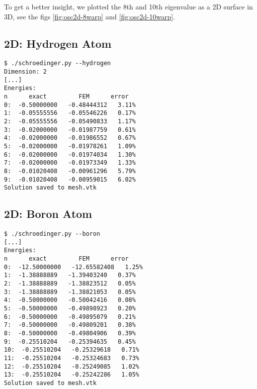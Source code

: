 








To get a better insight, we plotted the 8th and 10th eigenvalue as a 2D surface
in 3D, see the figs \ref{fig:osc2d-8warp} and \ref{fig:osc2d-10warp}.



\subsection{2D: Hydrogen Atom}

\begin{lstlisting}
$ ./schroedinger.py --hydrogen
Dimension: 2
[...]
Energies:
n      exact         FEM      error
0:  -0.50000000   -0.48444312   3.11%
1:  -0.05555556   -0.05546226   0.17%
2:  -0.05555556   -0.05490833   1.17%
3:  -0.02000000   -0.01987759   0.61%
4:  -0.02000000   -0.01986552   0.67%
5:  -0.02000000   -0.01978261   1.09%
6:  -0.02000000   -0.01974034   1.30%
7:  -0.02000000   -0.01973349   1.33%
8:  -0.01020408   -0.00961296   5.79%
9:  -0.01020408   -0.00959015   6.02%
Solution saved to mesh.vtk
\end{lstlisting}

\subsection{2D: Boron Atom}

\begin{lstlisting}
$ ./schroedinger.py --boron
[...]
Energies:
n      exact         FEM      error
0:  -12.50000000   -12.65582408   1.25%
1:  -1.38888889   -1.39403240   0.37%
2:  -1.38888889   -1.38823512   0.05%
3:  -1.38888889   -1.38821053   0.05%
4:  -0.50000000   -0.50042416   0.08%
5:  -0.50000000   -0.49898923   0.20%
6:  -0.50000000   -0.49895079   0.21%
7:  -0.50000000   -0.49809201   0.38%
8:  -0.50000000   -0.49804906   0.39%
9:  -0.25510204   -0.25394635   0.45%
10:  -0.25510204   -0.25329618   0.71%
11:  -0.25510204   -0.25324683   0.73%
12:  -0.25510204   -0.25249085   1.02%
13:  -0.25510204   -0.25242286   1.05%
Solution saved to mesh.vtk
\end{lstlisting}


